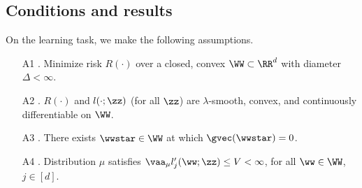 \documentclass[11pt,oneside]{article}
\makeatletter
\theoremstyle{definition} \newtheorem{defn}{Definition}       %
\theoremstyle{plain} \newtheorem{prop}[defn]{Proposition}           %
\theoremstyle{plain} \newtheorem{thm}[defn]{Theorem}                %
\theoremstyle{plain} \newtheorem{lem}[defn]{Lemma}                  %
\theoremstyle{plain} \newtheorem{cor}[defn]{Corollary}              %
\theoremstyle{remark} \newtheorem{rmk}[defn]{Remark}                %
\theoremstyle{remark} \newtheorem{ex}[defn]{Example}                %
\def\namedlabel#1#2{\begingroup
    #2%
    \def\@currentlabel{#2}%
    \phantomsection\label{#1}\endgroup
}
\makeatother
\begin{document}
\subsection{Conditions and results}\label{sec:algo_performance}

On the learning task, we make the following assumptions.
%
\begin{enumerate}
\item[\namedlabel{asmp:A1}{A1}.] Minimize risk $R(\cdot)$ over a closed, convex $\WW \subset \RR^{d}$ with diameter $\Delta < \infty$.
\item[\namedlabel{asmp:A2}{A2}.] $R(\cdot)$ and $l(\cdot;\zz)$ (for all $\zz$) are $\lambda$-smooth, convex, and continuously differentiable on $\WW$.
\item[\namedlabel{asmp:A3}{A3}.] There exists $\wwstar \in \WW$ at which $\gvec(\wwstar) = 0$.
\item[\namedlabel{asmp:A4}{A4}.] Distribution $\mu$ satisfies $\vaa_{\mu} l_{j}^{\prime}(\ww;\zz) \leq V < \infty$, for all $\ww \in \WW$, $j \in [d]$.
\end{enumerate}
\end{document}

